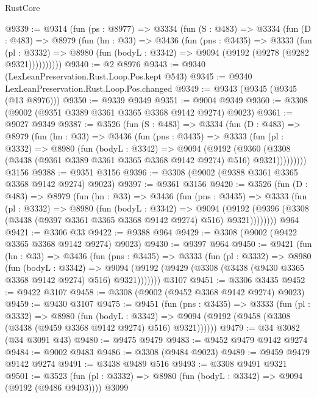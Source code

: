 \begin{lexlean}{RustCore}
\begin{coremodule}
@9339 := @9314
    (fun (ps : @8977) =>
    @3334
      (fun (S : @483) =>
      @3334
        (fun (D : @483) =>
        @8979
          (fun (hn : @33) =>
          @3436
            (fun (pns : @3435) =>
            @3333
              (fun (pl : @3332) =>
              @8980 (fun (bodyL : @3342) => @9094 (@9192 (@9278 (@9282 @9321))))))))))
@9340 := @2 @8976
@9343 := @9340 (LexLeanPreservation.Rust.Loop.Pos.kept @543)
@9345 := @9340 LexLeanPreservation.Rust.Loop.Pos.changed
@9349 := @9343 (@9345 (@9345 (@13 @8976)))
@9350 := @9339 @9349
@9351 := @9004 @9349
@9360 := @3308 (@9002 (@9351 @3389 @3361 @3365 @3368 @9142 @9274) @9023)
@9361 := @9027 @9349
@9387 := @3526
    (fun (S : @483) =>
    @3334
      (fun (D : @483) =>
      @8979
        (fun (hn : @33) =>
        @3436
          (fun (pns : @3435) =>
          @3333
            (fun (pl : @3332) =>
            @8980
              (fun (bodyL : @3342) =>
              @9094
                (@9192
                  (@9360
                    (@3308 (@3438 (@9361 @3389 @3361 @3365 @3368 @9142 @9274) @516) @9321)))))))))
    @3156
@9388 := @9351 @3156
@9396 := @3308 (@9002 (@9388 @3361 @3365 @3368 @9142 @9274) @9023)
@9397 := @9361 @3156
@9420 := @3526
    (fun (D : @483) =>
    @8979
      (fun (hn : @33) =>
      @3436
        (fun (pns : @3435) =>
        @3333
          (fun (pl : @3332) =>
          @8980
            (fun (bodyL : @3342) =>
            @9094
              (@9192 (@9396 (@3308 (@3438 (@9397 @3361 @3365 @3368 @9142 @9274) @516) @9321))))))))
    @964
@9421 := @3306 @33
@9422 := @9388 @964
@9429 := @3308 (@9002 (@9422 @3365 @3368 @9142 @9274) @9023)
@9430 := @9397 @964
@9450 := @9421
    (fun (hn : @33) =>
    @3436
      (fun (pns : @3435) =>
      @3333
        (fun (pl : @3332) =>
        @8980
          (fun (bodyL : @3342) =>
          @9094 (@9192 (@9429 (@3308 (@3438 (@9430 @3365 @3368 @9142 @9274) @516) @9321)))))))
    @3107
@9451 := @3306 @3435
@9452 := @9422 @3107
@9458 := @3308 (@9002 (@9452 @3368 @9142 @9274) @9023)
@9459 := @9430 @3107
@9475 := @9451
    (fun (pns : @3435) =>
    @3333
      (fun (pl : @3332) =>
      @8980
        (fun (bodyL : @3342) =>
        @9094 (@9192 (@9458 (@3308 (@3438 (@9459 @3368 @9142 @9274) @516) @9321))))))
@9479 := @34 @3082 (@34 @3091 @43)
@9480 := @9475 @9479
@9483 := @9452 @9479 @9142 @9274
@9484 := @9002 @9483
@9486 := @3308 (@9484 @9023)
@9489 := @9459 @9479 @9142 @9274
@9491 := @3438 @9489 @516
@9493 := @3308 @9491 @9321
@9501 := @3523
    (fun (pl : @3332) => @8980 (fun (bodyL : @3342) => @9094 (@9192 (@9486 @9493))))
    @3099

\end{coremodule}
\end{lexlean}
